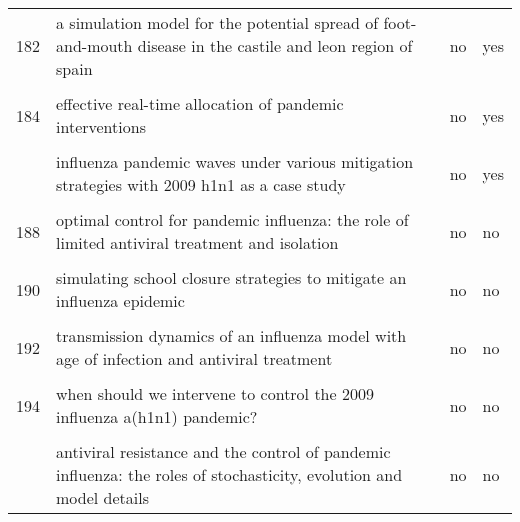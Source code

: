 \documentclass[
]{article}
\begin{document}
\begin{landscape}
\begin{longtable}{l>{\raggedright\arraybackslash}p{4cm}l>{\raggedright\arraybackslash}p{4cm}}
182 & a simulation model for the potential spread of foot-and-mouth disease in the castile and leon region of spain & no & yes\\
\cellcolor{gray!6}{183} & \cellcolor{gray!6}{community-based measures for mitigating the 2009 h1n1 pandemic in china} & \cellcolor{gray!6}{no} & \cellcolor{gray!6}{no}\\
184 & effective real-time allocation of pandemic interventions & no & yes\\
\cellcolor{gray!6}{185} & \cellcolor{gray!6}{efficient mitigation strategies for epidemics in rural regions} & \cellcolor{gray!6}{no} & \cellcolor{gray!6}{yes}\\
\addlinespace
186 & influenza pandemic waves under various mitigation strategies with 2009 h1n1 as a case study & no & yes\\
\cellcolor{gray!6}{187} & \cellcolor{gray!6}{is a mass immunization program for pandemic (h1n1) 2009 good value for money? early evidence from the canadian experience} & \cellcolor{gray!6}{no} & \cellcolor{gray!6}{yes}\\
188 & optimal control for pandemic influenza: the role of limited antiviral treatment and isolation & no & no\\
\cellcolor{gray!6}{189} & \cellcolor{gray!6}{optimizing vaccine allocation at different points in time during an epidemic} & \cellcolor{gray!6}{no} & \cellcolor{gray!6}{yes}\\
190 & simulating school closure strategies to mitigate an influenza epidemic & no & no\\
\addlinespace
\cellcolor{gray!6}{191} & \cellcolor{gray!6}{the effect of mask use on the spread of influenza during a pandemic} & \cellcolor{gray!6}{no} & \cellcolor{gray!6}{no}\\
192 & transmission dynamics of an influenza model with age of infection and antiviral treatment & no & no\\
\cellcolor{gray!6}{193} & \cellcolor{gray!6}{transmission risks and control of foot-and-mouth disease in the netherlands: spatial patterns} & \cellcolor{gray!6}{no} & \cellcolor{gray!6}{no}\\
194 & when should we intervene to control the 2009 influenza a(h1n1) pandemic? & no & no\\
\cellcolor{gray!6}{195} & \cellcolor{gray!6}{adaptive vaccination strategies to mitigate pandemic influenza} & \cellcolor{gray!6}{no} & \cellcolor{gray!6}{yes}\\
\addlinespace
196 & antiviral resistance and the control of pandemic influenza: the roles of stochasticity, evolution and model details & no & no\\

\end{longtable}
\end{landscape}
\end{document}
